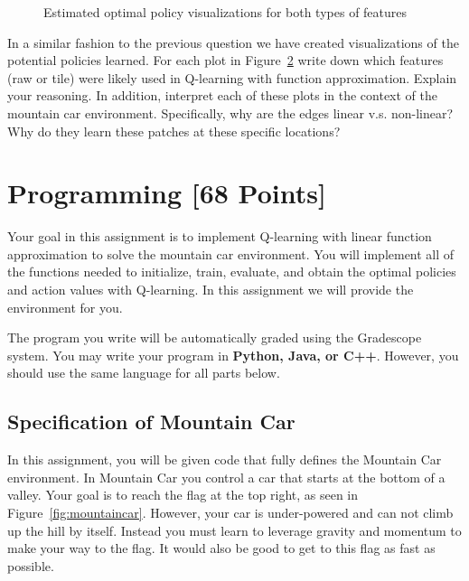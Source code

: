 \documentclass[11pt,addpoints,answers]{exam}
\begin{document}
\begin{questions}
\begin{figure}[H]
\begin{subfigure}{0.5\textwidth}
            \caption{}
            \label{fig:policy_b}
        \end{subfigure}
        \caption{Estimated optimal policy visualizations for both types of features}
        \label{fig:policy}
    \end{figure}

    \question[2] In a similar fashion to the previous question we have created visualizations of the potential policies learned. For each plot in Figure~\ref{fig:policy} write down which features (raw or tile) were likely used in Q-learning with function approximation. Explain your reasoning. In addition, interpret each of these plots in the context of the mountain car environment. Specifically, why are the edges linear v.s. non-linear? Why do they learn these patches at these specific locations? 
        
    \begin{your_solution}[title=Answer,height=5cm,width=15cm]
    \end{your_solution}
\end{questions}

    \clearpage
    \clearpage
\section{Programming [68 Points]}
\label{sec:code}

Your goal in this assignment is to implement Q-learning with linear function approximation to solve the mountain car environment. You will implement all of the functions needed to initialize, train, evaluate, and obtain the optimal policies and action values with Q-learning. In this assignment we will provide the environment for you.

The program you write will be automatically graded using the Gradescope system. You may write your program in \textbf{Python, Java, or C++}. However, you should use the same language for all parts below.

\subsection{Specification of Mountain Car}
In this assignment, you will be given code that fully defines the Mountain Car environment. In Mountain Car you control a car that starts at the bottom of a valley. Your goal is to reach the flag at the top right, as seen in Figure~\ref{fig:mountaincar}. However, your car is under-powered and can not climb up the hill by itself. Instead you must learn to leverage gravity and momentum to make your way to the flag. It would also be good to get to this flag as fast as possible.
\end{document}

